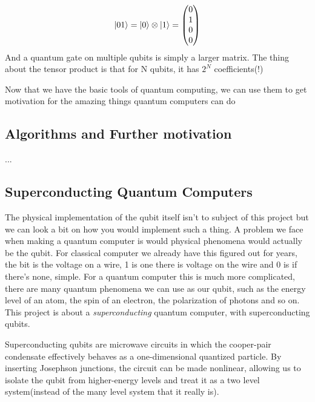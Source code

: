 \documentclass[english, a4paper, 12pt, twoside]{article}
\numberwithin{equation}{section} %
\begin{document}
\[\ket{01} = \ket{0} \otimes \ket{1} =
\begin{pmatrix}
    0 \\
    1 \\
    0 \\
    0
\end{pmatrix}\]
And a quantum gate on multiple qubits is simply a larger matrix. 
The thing about the tensor product is that for N qubits, it has $2^N$ coefficients(!) %

Now that we have the basic tools of quantum computing, we can use them to get motivation for the amazing things quantum computers can do

\subsection{Algorithms and Further motivation}
...
\subsection{Superconducting Quantum Computers}  %
The physical implementation of the qubit itself isn't to subject of this project but we can look a bit on how you would implement such a thing. A problem we face when making a quantum computer is would physical phenomena would actually be the qubit. For classical computer we already have this figured out for years, the bit is the voltage on a wire, 1 is one there is voltage on the wire and 0 is if there's none, simple. For a quantum computer this is much more complicated, there are many quantum phenomena we can use as our qubit, such as the energy level of an atom, the spin of an electron, the polarization of photons and so on. This project is about a \textit{superconducting} quantum computer, with superconducting  qubits.

Superconducting qubits are microwave circuits in which the cooper-pair condensate effectively behaves as a one-dimensional quantized particle. By inserting Josephson junctions, the circuit can be made nonlinear, allowing us to isolate the qubit from higher-energy levels and treat it as a two  level system(instead of the many level system that it really is).
\end{document}
